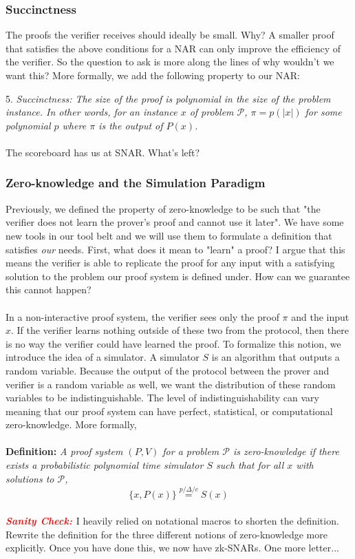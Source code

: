\documentclass{article}
\newcommand{\scheck}{\textbf{\textit{\textcolor{red}{Sanity Check: }}}}
\begin{document}
\subsubsection{Succinctness}
The proofs the verifier receives should ideally be small. Why? A smaller proof that satisfies the above conditions for a NAR can only improve the efficiency of the verifier. So the question to ask is more along the lines of why wouldn't we want this? More formally, we add the following property to our NAR:

5. \textit{Succinctness: The size of the proof is polynomial in the size of the problem instance. In other words, for an instance $x$ of problem $\mathcal{P}$, $\pi = p(\lvert x \rvert)$ for some polynomial $p$ where $\pi$ is the output of $P(x)$.} \\ \\
\noindent The scoreboard has us at SNAR. What's left?

\subsubsection{Zero-knowledge and the Simulation Paradigm}
Previously, we defined the property of zero-knowledge to be such that "the verifier does not learn the prover's proof and cannot use it later". We have some new tools in our tool belt and we will use them to formulate a definition that satisfies \textit{our} needs. First, what does it mean to "learn" a proof? I argue that this means the verifier is able to replicate the proof for any input with a satisfying solution to the problem our proof system is defined under. How can we guarantee this cannot happen? \\ \\
\noindent In a non-interactive proof system, the verifier sees only the proof $\pi$ and the input $x$. If the verifier learns nothing outside of these two from the protocol, then there is no way the verifier could have learned the proof. To formalize this notion, we introduce the idea of a simulator. A simulator $S$ is an algorithm that outputs a random variable. Because the output of the protocol between the prover and verifier is a random variable as well, we want the distribution of these random variables to be indistinguishable. The level of indistinguishability can vary meaning that our proof system can have perfect, statistical, or computational zero-knowledge. More formally, \\ \\
\noindent \textbf{Definition: } \textit{A proof system $(P, V)$ for a problem $\mathcal{P}$ is zero-knowledge if there exists a probabilistic polynomial time simulator $S$ such that for all $x$ with solutions to $\mathcal{P}$,}
$$\{x, P(x)\} \stackrel{p/\Delta/c}{=} S(x)$$
\\
\noindent \scheck I heavily relied on notational macros to shorten the definition. Rewrite the definition for the three different notions of zero-knowledge more explicitly. Once you have done this, we now have zk-SNARs. One more letter...
\end{document}

